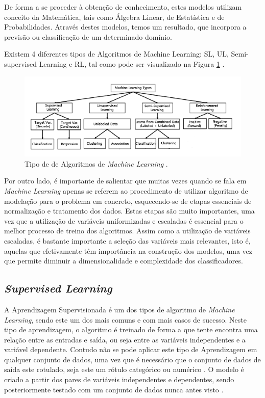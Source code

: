 \documentclass[12pt,a4paper,twoside]{report}
\begin{document}
{De forma a se proceder à obtenção de conhecimento, estes modelos utilizam conceito da Matemática, tais como Álgebra Linear, de Estatística e de Probabilidades\cite{Grus15}. Através destes modelos, temos um resultado, que incorpora a previsão ou classificação de um determinado domínio. 

Existem 4 diferentes tipos de Algoritmos de Machine Learning: \gls{SL}, \gls{UL}, Semi-supervised Learning e \Gls{RL}, tal como pode ser visualizado na Figura \ref{fig:tipoAprendizagem} \cite{10.1007/s42979-021-00592-x}. 

\begin{figure}[H]
    \centering
    \includegraphics[width=1\textwidth]{imagens/TiposAprendizagens.png}
    \caption{Tipo de de Algoritmos de \textit{Machine Learning} \cite{10.1007/s42979-021-00592-x}.}
    \label{fig:tipoAprendizagem}
\end{figure}

Por outro lado, é importante de salientar que muitas vezes quando se fala em \textit{Machine Learning} apenas se referem ao procedimento de utilizar algoritmo de modelação para o problema em concreto, esquecendo-se de etapas essenciais de normalização e tratamento dos dados. Estas etapas são muito importantes, uma vez que a utilização de variáveis uniformizadas e escaladas é essencial para o melhor processo de treino dos algoritmos. Assim como a utilização de variáveis escaladas, é bastante importante a seleção das variáveis mais relevantes, isto é, aquelas que efetivamente têm importância na construção dos modelos, uma vez que permite diminuir a dimensionalidade e complexidade dos classificadores.


\subsection{\textit{Supervised Learning}}

A Aprendizagem Supervisionada é um dos tipos de algoritmo de \textit{Machine Learning}, sendo este um dos mais comuns e com mais casos de sucesso. Neste tipo de aprendizagem, o algoritmo é treinado de forma a que tente encontra uma relação entre as entradas e saída, ou seja entre as variáveis independentes e a variável dependente. Contudo não se pode aplicar este tipo de Aprendizagem em qualquer conjunto de dados, uma vez que é necessário que o conjunto de dados de saída este rotulado, seja este um rótulo categórico ou numérico \cite{inbook}. O modelo é criado a partir dos pares de variáveis independentes e dependentes, sendo posteriormente testado com um conjunto de dados nunca antes visto \cite{müller2016introduction}.    

}
\end{document}
